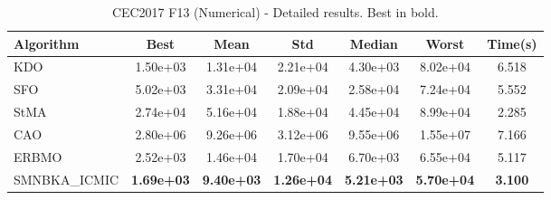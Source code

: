 \begin{table}[H]
\centering\small
\caption{CEC2017 F13 (Numerical) - Detailed results. Best in bold.}
\label{tab:cec2017_F13}
\begin{tabular}{lcccccc}
\toprule
\textbf{Algorithm} & \textbf{Best} & \textbf{Mean} & \textbf{Std} & \textbf{Median} & \textbf{Worst} & \textbf{Time(s)} \\
\midrule
KDO & 1.50e+03 & 1.31e+04 & 2.21e+04 & 4.30e+03 & 8.02e+04 & 6.518 \\
SFO & 5.02e+03 & 3.31e+04 & 2.09e+04 & 2.58e+04 & 7.24e+04 & 5.552 \\
StMA & 2.74e+04 & 5.16e+04 & 1.88e+04 & 4.45e+04 & 8.99e+04 & 2.285 \\
CAO & 2.80e+06 & 9.26e+06 & 3.12e+06 & 9.55e+06 & 1.55e+07 & 7.166 \\
ERBMO & 2.52e+03 & 1.46e+04 & 1.70e+04 & 6.70e+03 & 6.55e+04 & 5.117 \\
SMNBKA_ICMIC & \textbf{1.69e+03} & \textbf{9.40e+03} & \textbf{1.26e+04} & \textbf{5.21e+03} & \textbf{5.70e+04} & \textbf{3.100} \\
\bottomrule
\end{tabular}
\end{table}
